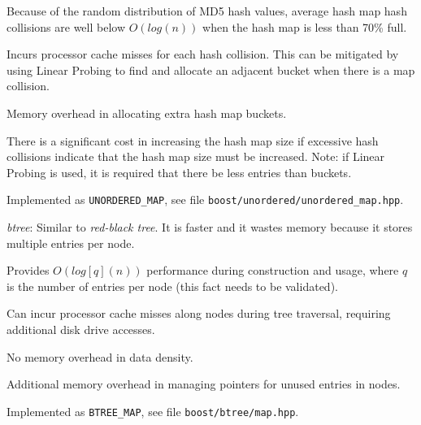 \documentclass[10pt,twoside]{article}
\begin{document}
\begin{compactitem}
\begin{compactitem}
Because of the random distribution of MD5 hash values, average hash map hash collisions
are well below \begin{math}{O(log(n))}\end{math} when the hash map is less than 70\% full.
\item Incurs processor cache misses for each hash collision.
This can be mitigated by using Linear Probing to find and allocate an adjacent bucket
when there is a map collision.
\item Memory overhead in allocating extra hash map buckets.
\item There is a significant cost in increasing the hash map size
if excessive hash collisions indicate that the hash map size must be increased.
Note: if Linear Probing is used, it is required that there be less entries than buckets.
\item Implemented as \texttt{UNORDERED\_MAP},
see file \texttt{boost/unordered/unordered\_map.hpp}.
\end{compactitem}
\item \emph{btree}:
Similar to \emph{red-black tree}.  It is faster and it wastes memory
because it stores multiple entries per node.
\begin{compactitem}
\item Provides \begin{math}{O(log[q](n))}\end{math} performance during construction and usage,
where \begin{math}q\end{math} is the number of entries per node (this fact needs to be validated).
\item Can incur processor cache misses along nodes during tree traversal,
requiring additional disk drive accesses.
\item No memory overhead in data density.
\item Additional memory overhead in managing pointers for unused entries in nodes.
\item Implemented as \texttt{BTREE\_MAP},
see file \texttt{boost/btree/map.hpp}.
\end{compactitem}
\end{compactitem}
\end{document}
